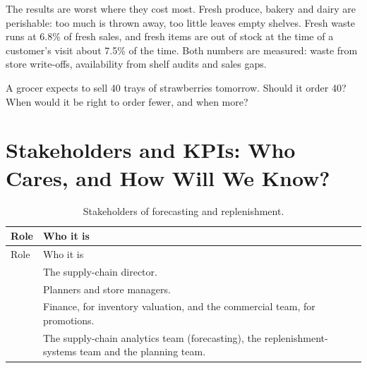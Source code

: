 The results are worst where they cost most. Fresh produce, bakery and dairy are perishable: too much is thrown away, too little leaves empty shelves. Fresh waste runs at 6.8\% of fresh sales, and fresh items are out of stock at the time of a customer's visit about 7.5\% of the time. Both numbers are measured: waste from store write-offs, availability from shelf audits and sales gaps.

\begin{thinkabout}
A grocer expects to sell 40 trays of strawberries tomorrow. Should it order 40? When would it be right to order fewer, and when more?
\end{thinkabout}

\section{Stakeholders and KPIs: Who Cares, and How Will We Know?}
\label{sec:fc-kpis}

\begingroup
\small
\begin{xltabular}{\textwidth}{@{}>{\raggedright\arraybackslash}p{2.0cm}>{\raggedright\arraybackslash}X@{}}
\caption{Stakeholders of forecasting and replenishment.}\label{tab:fc-stakeholders}\\
\toprule
{} Role & Who it is \\
\midrule
\endfirsthead
\toprule
{} Role & Who it is \\
\midrule
\endhead
{} & The supply-chain director. \\
 & Planners and store managers. \\
 & Finance, for inventory valuation, and the commercial team, for promotions. \\
 & The supply-chain analytics team (forecasting), the replenishment-systems team and the planning team. \\
\bottomrule
\end{xltabular}
\endgroup

